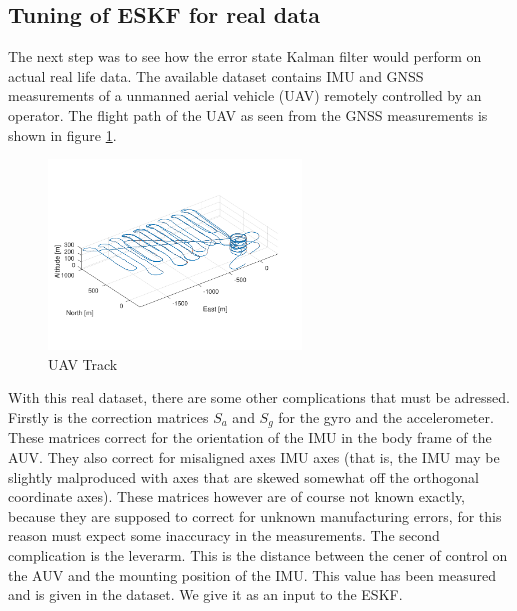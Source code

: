 \subsection{Tuning of ESKF for real data}
The next step was to see how the error state Kalman filter would perform on actual real life data. The available dataset contains IMU and GNSS measurements of a unmanned aerial vehicle (UAV) remotely controlled by an operator. The flight path of the UAV as seen from the GNSS measurements is shown in figure \ref{fig:real-track}.
\begin{figure}[H]
\centering
\includegraphics[width=0.6\textwidth]{plots/a2-real-track}
\caption{UAV Track}
\label{fig:real-track}
\end{figure}
With this real dataset, there are some other complications that must be adressed. Firstly is the correction matrices $S_a$ and $S_g$ for the gyro and the accelerometer. These matrices correct for the orientation of the IMU in the body frame of the AUV. They also correct for misaligned axes IMU axes (that is, the IMU may be slightly malproduced with axes that are skewed somewhat off the orthogonal coordinate axes). These matrices however are of course not known exactly, because they are supposed to correct for unknown manufacturing errors, for this reason must expect some inaccuracy in the measurements. The second complication is the leverarm. This is the distance between the cener of control on the AUV and the mounting position of the IMU. This value has been measured and is given in the dataset. We give it as an input to the ESKF.

